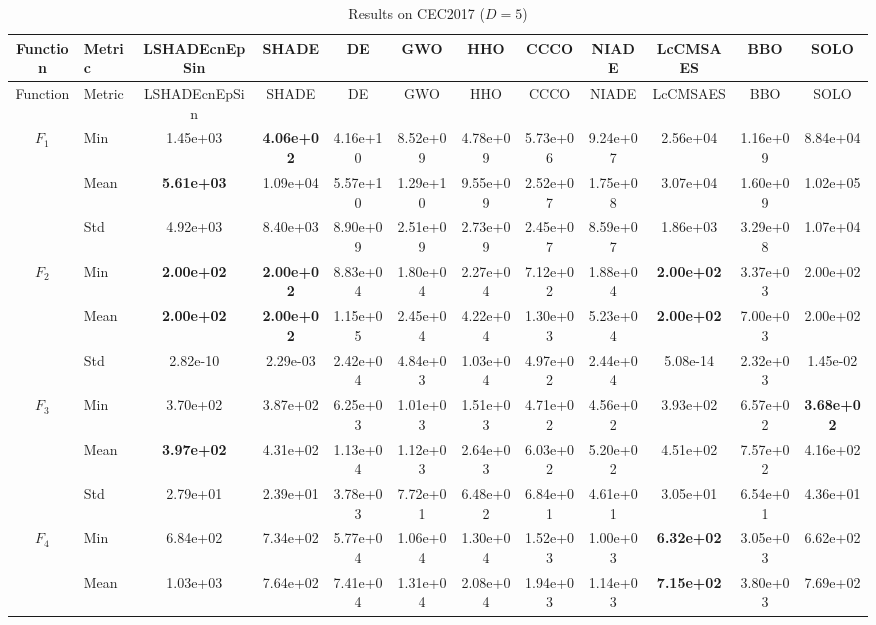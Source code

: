 \begin{center}
\small
\renewcommand{\arraystretch}{1.25}
\begin{longtable}{clcccccccccc}
\caption{Results on CEC2017 ($D=5$) }
\label{tab:results_CEC2017_5} \\
\toprule
Function & Metric & LSHADEcnEpSin & SHADE & DE & GWO & HHO & CCCO & NIADE & LcCMSAES & BBO & SOLO \\
\midrule
\endfirsthead
\toprule
Function & Metric & LSHADEcnEpSin & SHADE & DE & GWO & HHO & CCCO & NIADE & LcCMSAES & BBO & SOLO \\
\midrule
\endhead
\multirow{3}{*}{$F_{1}$} & Min & 1.45e+03 & \textbf{4.06e+02} & 4.16e+10 & 8.52e+09 & 4.78e+09 & 5.73e+06 & 9.24e+07 & 2.56e+04 & 1.16e+09 & 8.84e+04 \\
 & Mean & \textbf{5.61e+03} & 1.09e+04 & 5.57e+10 & 1.29e+10 & 9.55e+09 & 2.52e+07 & 1.75e+08 & 3.07e+04 & 1.60e+09 & 1.02e+05 \\
 & Std & 4.92e+03 & 8.40e+03 & 8.90e+09 & 2.51e+09 & 2.73e+09 & 2.45e+07 & 8.59e+07 & 1.86e+03 & 3.29e+08 & 1.07e+04 \\
\midrule
\multirow{3}{*}{$F_{2}$} & Min & \textbf{2.00e+02} & \textbf{2.00e+02} & 8.83e+04 & 1.80e+04 & 2.27e+04 & 7.12e+02 & 1.88e+04 & \textbf{2.00e+02} & 3.37e+03 & 2.00e+02 \\
 & Mean & \textbf{2.00e+02} & \textbf{2.00e+02} & 1.15e+05 & 2.45e+04 & 4.22e+04 & 1.30e+03 & 5.23e+04 & \textbf{2.00e+02} & 7.00e+03 & 2.00e+02 \\
 & Std & 2.82e-10 & 2.29e-03 & 2.42e+04 & 4.84e+03 & 1.03e+04 & 4.97e+02 & 2.44e+04 & 5.08e-14 & 2.32e+03 & 1.45e-02 \\
\midrule
\multirow{3}{*}{$F_{3}$} & Min & 3.70e+02 & 3.87e+02 & 6.25e+03 & 1.01e+03 & 1.51e+03 & 4.71e+02 & 4.56e+02 & 3.93e+02 & 6.57e+02 & \textbf{3.68e+02} \\
 & Mean & \textbf{3.97e+02} & 4.31e+02 & 1.13e+04 & 1.12e+03 & 2.64e+03 & 6.03e+02 & 5.20e+02 & 4.51e+02 & 7.57e+02 & 4.16e+02 \\
 & Std & 2.79e+01 & 2.39e+01 & 3.78e+03 & 7.72e+01 & 6.48e+02 & 6.84e+01 & 4.61e+01 & 3.05e+01 & 6.54e+01 & 4.36e+01 \\
\midrule
\multirow{3}{*}{$F_{4}$} & Min & 6.84e+02 & 7.34e+02 & 5.77e+04 & 1.06e+04 & 1.30e+04 & 1.52e+03 & 1.00e+03 & \textbf{6.32e+02} & 3.05e+03 & 6.62e+02 \\
 & Mean & 1.03e+03 & 7.64e+02 & 7.41e+04 & 1.31e+04 & 2.08e+04 & 1.94e+03 & 1.14e+03 & \textbf{7.15e+02} & 3.80e+03 & 7.69e+02 \\

\end{longtable}
\end{center}
